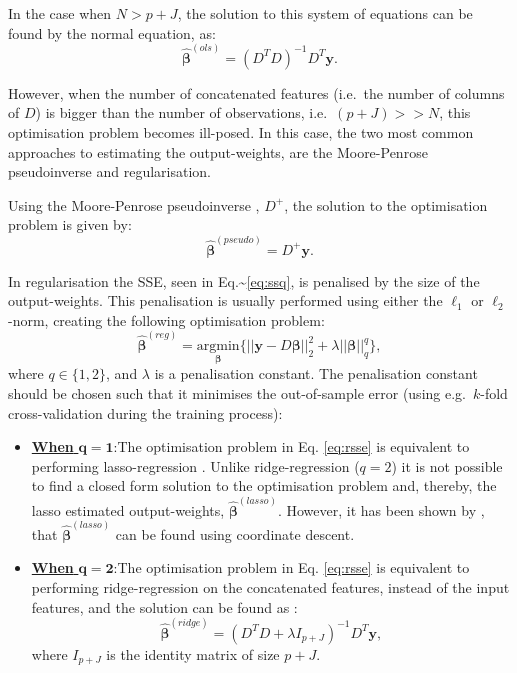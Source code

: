 \documentclass[
]{jss}
\begin{document}
In the case when \(N > p + J\), the solution to this system of equations
can be found by the normal equation, as: \begin{equation}
    \hat{\boldsymbol{\beta}}^{(ols)} = (D^T D)^{-1}D^T\boldsymbol{y}. \label{eq:ols}
\end{equation}

However, when the number of concatenated features (i.e.~the number of
columns of \(D\)) is bigger than the number of observations,
i.e.~\((p + J) >> N\), this optimisation problem becomes ill-posed. In
this case, the two most common approaches to estimating the
output-weights, are the Moore-Penrose pseudoinverse and regularisation.

Using the Moore-Penrose pseudoinverse
\citep[\citet{PenroseInv}]{BjerhammarInv}, \(D^+\), the solution to the
optimisation problem is given by: \begin{equation}
    \hat{\boldsymbol \beta}^{(pseudo)} = D^+ \boldsymbol y.
\end{equation}

In regularisation the SSE, seen in Eq.\textasciitilde{}\eqref{eq:ssq},
is penalised by the size of the output-weights. This penalisation is
usually performed using either the \(\ell_1\) or \(\ell_2\)-norm,
creating the following optimisation problem: \begin{equation}
    \hat{\boldsymbol{\beta}}^{(reg)} = \underset{\boldsymbol{\beta}}{\text{argmin}} \Big\{ || \boldsymbol{y} - D\boldsymbol{\beta}||_2^2  + \lambda||\boldsymbol{\beta}||_q^q \Big\}, \label{eq:rsse}
\end{equation} where \(q \in \{1, 2\}\), and \(\lambda\) is a
penalisation constant. The penalisation constant should be chosen such
that it minimises the out-of-sample error (using e.g.~\(k\)-fold
cross-validation during the training process):

\begin{itemize}
\item
  \underline{\textbf{When} $\boldsymbol{q = 1}$}:\newline  The
  optimisation problem in Eq. \eqref{eq:rsse} is equivalent to
  performing lasso-regression \citep[\citet{TibLasso}]{SanLasso}. Unlike
  ridge-regression (\(q = 2\)) it is not possible to find a closed form
  solution to the optimisation problem and, thereby, the lasso estimated
  output-weights, \(\hat{\boldsymbol{\beta}}^{(lasso)}\). However, it
  has been shown by \citep{CoordLasso}, that
  \(\hat{\boldsymbol{\beta}}^{(lasso)}\) can be found using coordinate
  descent.
\item
  \underline{\textbf{When} $\boldsymbol{q = 2}$}:\newline  The
  optimisation problem in Eq. \eqref{eq:rsse} is equivalent to
  performing ridge-regression on the concatenated features, instead of
  the input features, and the solution can be found as \citep{ridgeReg}:
  \begin{equation}
  \hat{\boldsymbol \beta}^{(ridge)} = \left(D^TD + \lambda I_{p + J}\right)^{-1}D^T\boldsymbol y,
  \end{equation} where \(I_{p+J}\) is the identity matrix of size
  \(p+J\).
\end{itemize}
\end{document}

